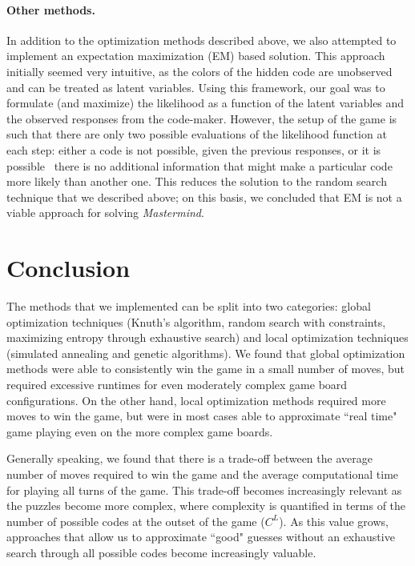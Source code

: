\documentclass[11pt]{article}
\begin{document}
\paragraph{Other methods.} In addition to the optimization methods described above, we also attempted to implement an expectation maximization (EM) based solution. This approach initially seemed very intuitive, as the colors of the hidden code are unobserved and can be treated as latent variables. Using this framework, our goal was to formulate (and maximize) the likelihood as a function of the latent variables and the observed responses from the code-maker. However, the setup of the game is such that there are only two possible evaluations of the likelihood function at each step: either a code is not possible, given the previous responses, or it is possible \textendash \ there is no additional information that might make a particular code more likely than another one. This reduces the solution to the random search technique that we described above; on this basis, we concluded that EM is not a viable approach for solving \textit{Mastermind}.

\section{Conclusion}

The methods that we implemented can be split into two categories: global optimization techniques (Knuth's algorithm, random search with constraints, maximizing entropy through exhaustive search) and local optimization techniques (simulated annealing and genetic algorithms).  We found that global optimization methods were able to consistently win the game in a small number of moves, but required excessive runtimes for even moderately complex game board configurations. On the other hand, local optimization methods required more moves to win the game, but were in most cases able to approximate ``real time" game playing even on the more complex game boards.


Generally speaking, we found that there is a trade-off between the average number of moves required to win the game and the average computational time for playing all turns of the game. This trade-off becomes increasingly relevant as the puzzles become more complex, where complexity is quantified in terms of the number of possible codes at the outset of the game ($C^L$). As this value grows, approaches that allow us to approximate ``good" guesses without an exhaustive search through all possible codes become increasingly valuable.
\end{document}
